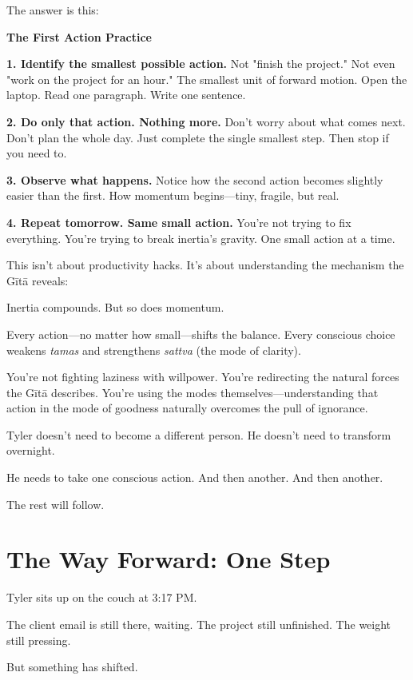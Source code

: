 \documentclass[11pt,twoside]{book}
\begin{document}
The answer is this:

\begin{practicebox}
\textbf{The First Action Practice}

\textbf{1. Identify the smallest possible action.}
Not "finish the project." Not even "work on the project for an hour." The smallest unit of forward motion. Open the laptop. Read one paragraph. Write one sentence.

\textbf{2. Do only that action. Nothing more.}
Don't worry about what comes next. Don't plan the whole day. Just complete the single smallest step. Then stop if you need to.

\textbf{3. Observe what happens.}
Notice how the second action becomes slightly easier than the first. How momentum begins—tiny, fragile, but real.

\textbf{4. Repeat tomorrow. Same small action.}
You're not trying to fix everything. You're trying to break inertia's gravity. One small action at a time.
\end{practicebox}

This isn't about productivity hacks. It's about understanding the mechanism the Gītā reveals:

Inertia compounds. But so does momentum.

Every action—no matter how small—shifts the balance. Every conscious choice weakens \emph{tamas} and strengthens \emph{sattva} (the mode of clarity).

You're not fighting laziness with willpower. You're redirecting the natural forces the Gītā describes. You're using the modes themselves—understanding that action in the mode of goodness naturally overcomes the pull of ignorance.

Tyler doesn't need to become a different person. He doesn't need to transform overnight.

He needs to take one conscious action. And then another. And then another.

The rest will follow.

\section*{The Way Forward: One Step}

Tyler sits up on the couch at 3:17 PM.

The client email is still there, waiting. The project still unfinished. The weight still pressing.

But something has shifted.
\end{document}
